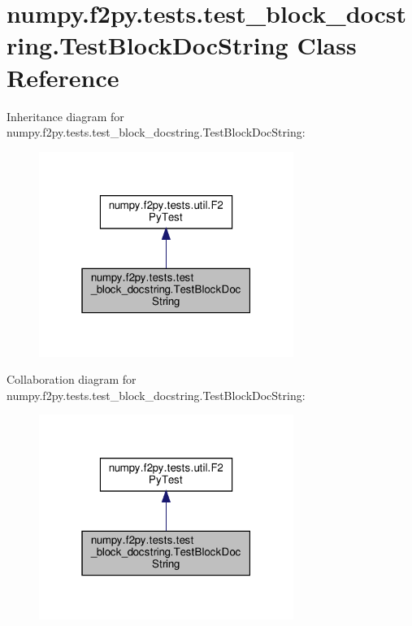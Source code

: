 \hypertarget{classnumpy_1_1f2py_1_1tests_1_1test__block__docstring_1_1TestBlockDocString}{}\section{numpy.\+f2py.\+tests.\+test\+\_\+block\+\_\+docstring.\+Test\+Block\+Doc\+String Class Reference}
\label{classnumpy_1_1f2py_1_1tests_1_1test__block__docstring_1_1TestBlockDocString}


Inheritance diagram for numpy.\+f2py.\+tests.\+test\+\_\+block\+\_\+docstring.\+Test\+Block\+Doc\+String\+:
\nopagebreak
\begin{figure}[H]
\begin{center}
\leavevmode
\includegraphics[width=235pt]{classnumpy_1_1f2py_1_1tests_1_1test__block__docstring_1_1TestBlockDocString__inherit__graph}
\end{center}
\end{figure}


Collaboration diagram for numpy.\+f2py.\+tests.\+test\+\_\+block\+\_\+docstring.\+Test\+Block\+Doc\+String\+:
\nopagebreak
\begin{figure}[H]
\begin{center}
\leavevmode
\includegraphics[width=235pt]{classnumpy_1_1f2py_1_1tests_1_1test__block__docstring_1_1TestBlockDocString__coll__graph}
\end{center}
\end{figure}
